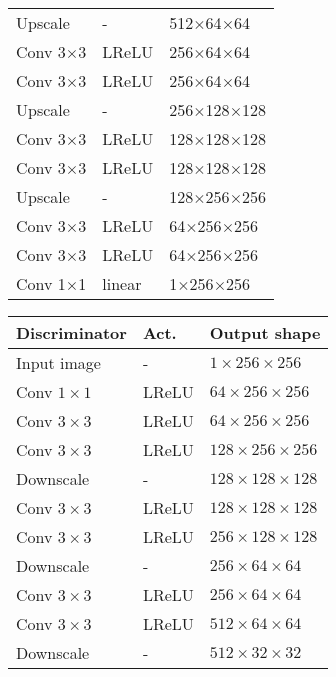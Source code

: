 \documentclass[journal, onecolumn]{IEEEtran}
\begin{document}
\begin{table}[H]
\begin{minipage}[t]{0.48\linewidth}
\begin{adjustbox}{width=0.72\columnwidth,center}
{\begin{tabular}[t]{|lll|}
Upscale          & -      & 512$\times$64$\times$64  \\
Conv 3$\times$3      & LReLU & 256$\times$64$\times$64      \\
Conv 3$\times$3      & LReLU & 256$\times$64$\times$64      \\ \hline

Upscale          & -      & 256$\times$128$\times$128  \\
Conv 3$\times$3      & LReLU & 128$\times$128$\times$128      \\
Conv 3$\times$3      & LReLU & 128$\times$128$\times$128      \\ \hline

Upscale          & -      & 128$\times$256$\times$256  \\
Conv 3$\times$3      & LReLU & 64$\times$256$\times$256      \\
Conv 3$\times$3      & LReLU & 64$\times$256$\times$256      \\
Conv 1$\times$1      & linear & 1$\times$256$\times$256      \\ \hline
\end{tabular}
}\hfill
\parbox[t][][t]{.4\linewidth}{
\begin{tabular}[t]{|lll|}
\hline
\textbf{Discriminator}       & Act.  & Output shape \\ \hline
Input image  & -      & $1\times256\times256$      \\
Conv $1\times1$      & LReLU & $64\times256\times256$      \\
Conv $3\times3$      & LReLU & $64\times256\times256$      \\
Conv $3\times3$      & LReLU & $128\times256\times256$      \\ 
Downscale & -      & $128\times128\times128$  \\ \hline

Conv $3\times3$      & LReLU & $128\times128\times128$      \\
Conv $3\times3$      & LReLU & $256\times128\times128$      \\ 
Downscale & -      & $256\times64\times64$  \\ \hline

Conv $3\times3$      & LReLU & $256\times64\times64$      \\
Conv $3\times3$      & LReLU & $512\times64\times64$      \\ 
Downscale & -      & $512\times32\times32$  \\ \hline


\end{tabular}}
\end{adjustbox}
\end{minipage}
\end{table}
\end{document}
